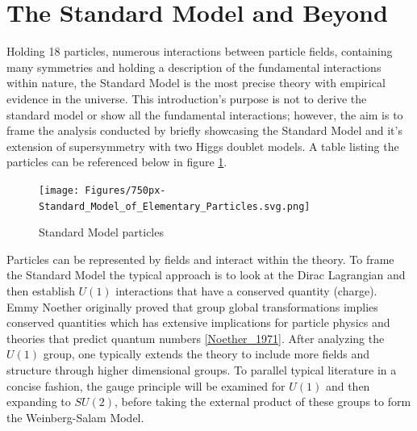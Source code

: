 \section{The Standard Model and Beyond}

Holding 18 particles, numerous interactions between particle fields, containing many symmetries and holding a description of the fundamental interactions within nature, the Standard Model is the most precise theory with empirical evidence in the universe. This introduction's purpose is not to derive the standard model or show all the fundamental interactions; however, the aim is to frame the analysis conducted by briefly showcasing the Standard Model and it's extension of supersymmetry with two Higgs doublet models. A table listing the particles can be referenced below in figure \ref{fig:SM}. 
\begin{figure}[ht!b]
  \centering
  \texttt{[image: Figures/750px-Standard\_Model\_of\_Elementary\_Particles.svg.png]}
  \caption{\label{fig:SM} Standard Model particles }
\end{figure}

Particles can be represented by fields and interact within the theory. To frame the Standard Model the typical approach is to look at the Dirac Lagrangian and then establish $U(1) $ interactions that have a conserved quantity (charge). Emmy Noether originally proved that group global transformations implies conserved quantities which has extensive implications for particle physics and theories that predict quantum numbers \ref{Noether_1971}. After analyzing the $U(1)$ group, one typically extends the theory to include more fields and structure through higher dimensional groups. To parallel typical literature in a concise fashion, the gauge principle will be examined for $U(1)$ and then expanding to $SU(2)$, before taking the external product of these groups to form the Weinberg-Salam Model.

